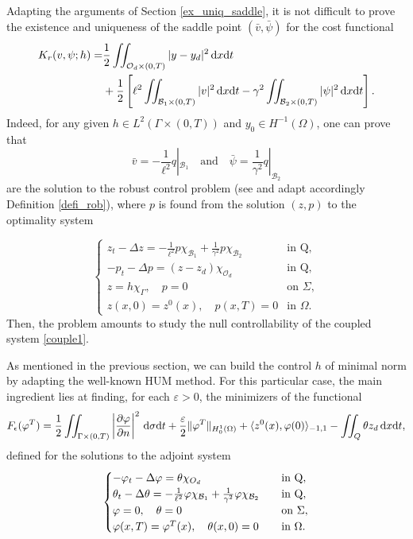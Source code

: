 \documentclass{aims}
\theoremstyle{definition}
\def\cbd{\Gamma}
\newcommand\csin[1]{\chi_{#1}}
\def\dx{\,\textnormal{d}x}
\def\dt{\textnormal{d}t}
\def\d{\,\textnormal{d}}
\begin{document}
Adapting the arguments of Section \ref{ex_uniq_saddle}, it is not difficult to prove the existence and uniqueness of the saddle point $(\bar v,\bar \psi)$ for the cost functional 
%
\begin{equation*}%
\begin{split}
K_r(v,\psi;h)=&\frac{1}{2}\iint_{\mathcal O_d\times(0,T)}|y-y_d|^2\dx\dt\\
&+\frac{1}{2}\left[\ell^2\iint_{\mathcal B_1\times(0,T)}|v|^2\dx\dt-\gamma^2\iint_{\mathcal B_2\times(0,T)}|\psi|^2\dx\dt\right].
\end{split}
\end{equation*}
%
Indeed, for any given $h\in L^2(\cbd\times(0,T))$ and $y_0\in H^{-1}(\Omega)$, one can prove that
%
\begin{equation*}
\bar v=-\frac{1}{\ell^2}q|_{\mathcal B_1} \quad\text{and}\quad \bar \psi=\frac{1}{\gamma^2}q|_{\mathcal B_2}
\end{equation*}
%
are the solution to the robust control problem (see and adapt accordingly Definition \ref{defi_rob}), where $p$ is found from the solution $(z,p)$ to the optimality system 

\begin{equation}\label{couple1}
\begin{cases}
z_t-\Delta z=-\frac{1}{\ell^2}p\csin{\mathcal B_1}+\frac{1}{\gamma^2}p\csin{\mathcal B_2} & \text{in Q}, \\
-p_t-\Delta p=(z-z_d)\chi_{\mathcal O_d} & \text{in Q}, \\
z=h\csin{\Gamma}, \quad p=0 &\text{on } \Sigma, \\
z(x,0)=z^0(x), \quad p(x,T)=0& \text{in } \Omega.
\end{cases}
\end{equation}
%
Then, the problem amounts to study the null controllability of the coupled system \eqref{couple1}. 

As mentioned in the previous section, we can build the control $h$ of minimal norm by adapting the well-known HUM method. For this particular case, the main ingredient lies at finding, for each $\varepsilon>0$, the minimizers of the functional
%
\begin{equation}\label{func_FR}
F_{\epsilon}(\varphi^T)=\frac{1}{2}\iint_{\cbd\times(0,T)}\left|\frac{\partial \varphi}{\partial n}\right|^2\d\sigma\dt+\frac{\varepsilon}{2}\|\varphi^T\|_{H_0^1(\Omega)}+\langle z^0(x),\varphi(0)\rangle_{-1,1}-\iint_{Q}\theta z_d \dx\dt,
\end{equation}
%
defined for the solutions to the adjoint system
%
\begin{equation}\label{adjunto1}
\begin{cases}
-\varphi_t-\Delta \varphi=\theta\csin{\mathcal \mathcal O_d} &\quad \text{in Q}, \\
\theta_t-\Delta \theta=-\frac{1}{\ell^2}\varphi\csin{\mathcal B_1}+\frac{1}{\gamma^2}\varphi \csin{\mathcal B_2} & \quad \text{in Q}, \\
\varphi=0, \quad \theta=0 &\quad \text{on } \Sigma, \\
\varphi(x,T)=\varphi^T(x), \quad \theta(x,0)=0&\quad \text{in } \Omega.
\end{cases}
\end{equation}
\end{document}
